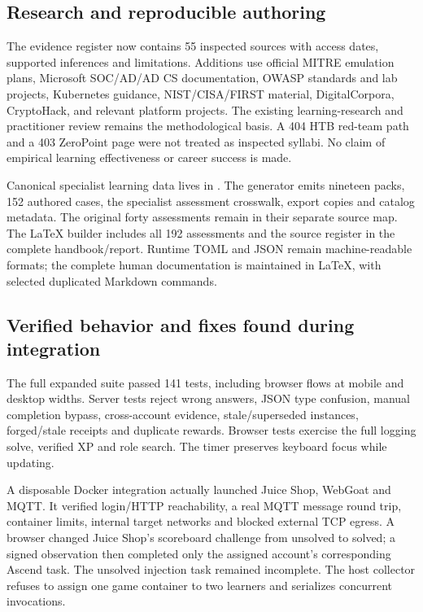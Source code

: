 \subsection{Research and reproducible authoring}
The evidence register now contains 55 inspected sources with access dates, supported
inferences and limitations. Additions use official MITRE emulation plans, Microsoft
SOC/AD/AD CS documentation, OWASP standards and lab projects, Kubernetes guidance,
NIST/CISA/FIRST material, DigitalCorpora, CryptoHack, and relevant platform projects.
The existing learning-research and practitioner review remains the methodological
basis. A 404 HTB red-team path and a 403 ZeroPoint page were not treated as inspected
syllabi. No claim of empirical learning effectiveness or career success is made.

Canonical specialist learning data lives in
. The generator emits nineteen packs,
152 authored cases, the specialist assessment crosswalk, export copies and catalog
metadata. The original forty assessments remain in their separate source map. The
LaTeX builder includes all 192 assessments and the source register in the complete
handbook/report. Runtime TOML and JSON remain machine-readable formats; the complete
human documentation is maintained in LaTeX, with selected duplicated Markdown commands.

\subsection{Verified behavior and fixes found during integration}
The full expanded suite passed 141 tests, including browser flows at mobile and
desktop widths. Server tests reject wrong answers, JSON type confusion, manual
completion bypass, cross-account evidence, stale/superseded instances, forged/stale
receipts and duplicate rewards. Browser tests exercise the full logging solve,
verified XP and role search. The timer preserves keyboard focus while updating.

A disposable Docker integration actually launched Juice Shop, WebGoat and MQTT.
It verified login/HTTP reachability, a real MQTT message round trip, container limits,
internal target networks and blocked external TCP egress. A browser changed Juice
Shop's scoreboard challenge from unsolved to solved; a signed observation then
completed only the assigned account's corresponding Ascend task. The unsolved
injection task remained incomplete. The host collector refuses to assign one game
container to two learners and serializes concurrent invocations.

